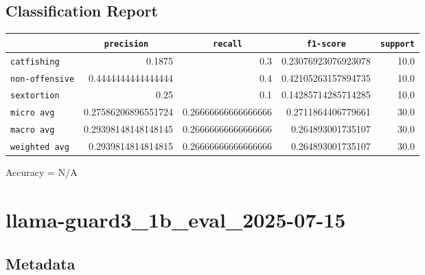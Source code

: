 \documentclass{article}
\begin{document}
\subsection{Classification Report}

\begin{center}
\begin{tabular}{l | r | r | r | r} \hline
    \verb|            | & \verb|    precision     | & \verb|      recall      | & \verb|     f1-score     | & \verb|support| \\ \hline
    \hline
    \verb|catfishing | & 0.1875 & 0.3 & 0.23076923076923078 &    10.0 \\ \hline
    \verb|non-offensive| & 0.4444444444444444 & 0.4 & 0.42105263157894735 &    10.0 \\ \hline
    \verb|sextortion | & 0.25 & 0.1 & 0.14285714285714285 &    10.0 \\ \hline
    \verb|micro avg  | & 0.27586206896551724 & 0.26666666666666666 & 0.2711864406779661 &    30.0 \\ \hline
    \verb|macro avg  | & 0.29398148148148145 & 0.26666666666666666 & 0.264893001735107 &    30.0 \\ \hline
    \verb|weighted avg| & 0.2939814814814815 & 0.26666666666666666 & 0.264893001735107 &    30.0 \\ \hline
\end{tabular}
\end{center}

\begin{center}
Accuracy = N/A
\end{center}

\section{llama-guard3\_1b\_eval\_2025-07-15}
\subsection{Metadata}
\end{document}
